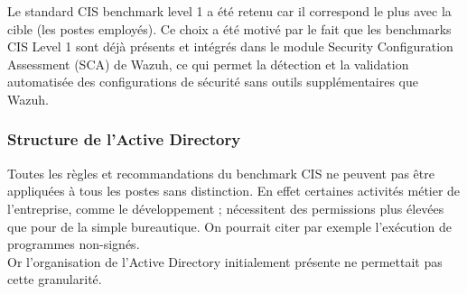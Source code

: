 \documentclass[a4paper, 11pt]{article}
\begin{document}
  Le standard CIS benchmark level 1 a été retenu car il correspond le plus avec la cible (les postes employés).
  Ce choix a été motivé par le fait que les benchmarks CIS Level 1 sont déjà présents et intégrés dans le module Security Configuration Assessment (SCA) de Wazuh,
  ce qui permet la détection et la validation automatisée des configurations de sécurité sans outils supplémentaires que Wazuh.

\par\bigskip
\subsubsection{Structure de l'Active Directory}

Toutes les règles et recommandations du benchmark CIS ne peuvent pas être appliquées à tous les postes sans distinction. En effet certaines activités métier de l'entreprise, comme le développement ; nécessitent des permissions plus élevées que pour de la simple bureautique. On pourrait citer par exemple l'exécution de programmes non-signés.\\
Or l'organisation de l'Active Directory initialement présente ne permettait pas cette granularité.
\end{document}
